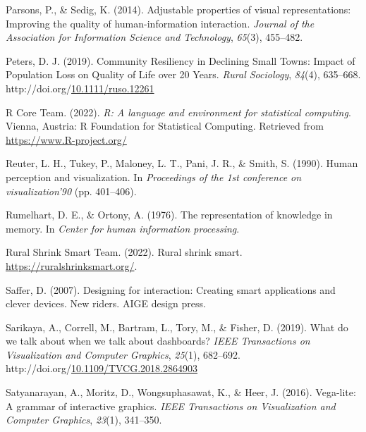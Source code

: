 \documentclass[print]{nuthesis}
\newlength{\cslhangindent}
\newenvironment{CSLReferences}[2]%
{\setlength{\parindent}{0pt}%
\everypar{\setlength{\hangindent}{\cslhangindent}}\ignorespaces}%
{\par}
\begin{document}
\begin{CSLReferences}{1}{0}
\leavevmode{}%
Parsons, P., \& Sedig, K. (2014). Adjustable properties of visual representations: Improving the quality of human-information interaction. \emph{Journal of the Association for Information Science and Technology}, \emph{65}(3), 455--482.

\leavevmode{}%
Peters, D. J. (2019). Community {Resiliency} in {Declining} {Small} {Towns}: {Impact} of {Population} {Loss} on {Quality} of {Life} over 20 {Years}. \emph{Rural Sociology}, \emph{84}(4), 635--668. http://doi.org/\href{https://doi.org/10.1111/ruso.12261}{10.1111/ruso.12261}

\leavevmode{}%
R Core Team. (2022). \emph{R: A language and environment for statistical computing}. Vienna, Austria: R Foundation for Statistical Computing. Retrieved from \url{https://www.R-project.org/}

\leavevmode{}%
Reuter, L. H., Tukey, P., Maloney, L. T., Pani, J. R., \& Smith, S. (1990). Human perception and visualization. In \emph{Proceedings of the 1st conference on visualization'90} (pp. 401--406).

\leavevmode{}%
Rumelhart, D. E., \& Ortony, A. (1976). The representation of knowledge in memory. In \emph{Center for human information processing}.

\leavevmode{}%
Rural Shrink Smart Team. (2022). Rural shrink smart. \url{https://ruralshrinksmart.org/}.

\leavevmode{}%
Saffer, D. (2007). Designing for interaction: Creating smart applications and clever devices. New riders. AIGE design press.

\leavevmode{}%
Sarikaya, A., Correll, M., Bartram, L., Tory, M., \& Fisher, D. (2019). What do we talk about when we talk about dashboards? \emph{IEEE Transactions on Visualization and Computer Graphics}, \emph{25}(1), 682--692. http://doi.org/\href{https://doi.org/10.1109/TVCG.2018.2864903}{10.1109/TVCG.2018.2864903}

\leavevmode{}%
Satyanarayan, A., Moritz, D., Wongsuphasawat, K., \& Heer, J. (2016). Vega-lite: A grammar of interactive graphics. \emph{IEEE Transactions on Visualization and Computer Graphics}, \emph{23}(1), 341--350.


\end{CSLReferences}
\end{document}

